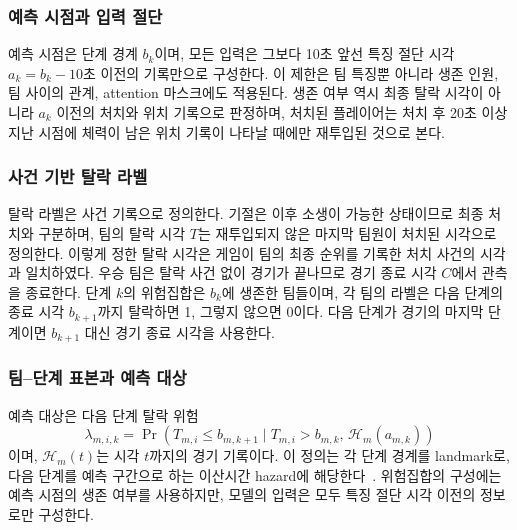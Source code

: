 \subsubsection{예측 시점과 입력 절단}
예측 시점은 단계 경계 $b_k$이며, 모든 입력은 그보다 10초 앞선 특징 절단 시각 $a_k=b_k-10$초 이전의 기록만으로 구성한다.
이 제한은 팀 특징뿐 아니라 생존 인원, 팀 사이의 관계, attention 마스크에도 적용된다.
생존 여부 역시 최종 탈락 시각이 아니라 $a_k$ 이전의 처치와 위치 기록으로 판정하며, 처치된 플레이어는 처치 후 20초 이상 지난 시점에 체력이 남은 위치 기록이 나타날 때에만 재투입된 것으로 본다.

\subsubsection{사건 기반 탈락 라벨}
탈락 라벨은 사건 기록으로 정의한다.
기절은 이후 소생이 가능한 상태이므로 최종 처치와 구분하며, 팀의 탈락 시각 $T$는 재투입되지 않은 마지막 팀원이 처치된 시각으로 정의한다.
이렇게 정한 탈락 시각은 게임이 팀의 최종 순위를 기록한 처치 사건의 시각과 일치하였다.
우승 팀은 탈락 사건 없이 경기가 끝나므로 경기 종료 시각 $C$에서 관측을 종료한다.
단계 $k$의 위험집합은 $b_k$에 생존한 팀들이며, 각 팀의 라벨은 다음 단계의 종료 시각 $b_{k+1}$까지 탈락하면 1, 그렇지 않으면 0이다.
다음 단계가 경기의 마지막 단계이면 $b_{k+1}$ 대신 경기 종료 시각을 사용한다.

\subsubsection{팀--단계 표본과 예측 대상}
예측 대상은 다음 단계 탈락 위험
\begin{equation}
\lambda_{m,i,k}=\Pr\!\left(T_{m,i}\le b_{m,k+1} \mid T_{m,i}>b_{m,k},\,\mathcal{H}_{m}(a_{m,k})\right)
\label{eq:hazard}
\end{equation}
이며, $\mathcal{H}_{m}(t)$는 시각 $t$까지의 경기 기록이다.
이 정의는 각 단계 경계를 landmark로, 다음 단계를 예측 구간으로 하는 이산시간 hazard에 해당한다~\cite{SingerWillett93,vanHouwelingen07}.
위험집합의 구성에는 예측 시점의 생존 여부를 사용하지만, 모델의 입력은 모두 특징 절단 시각 이전의 정보로만 구성한다.

